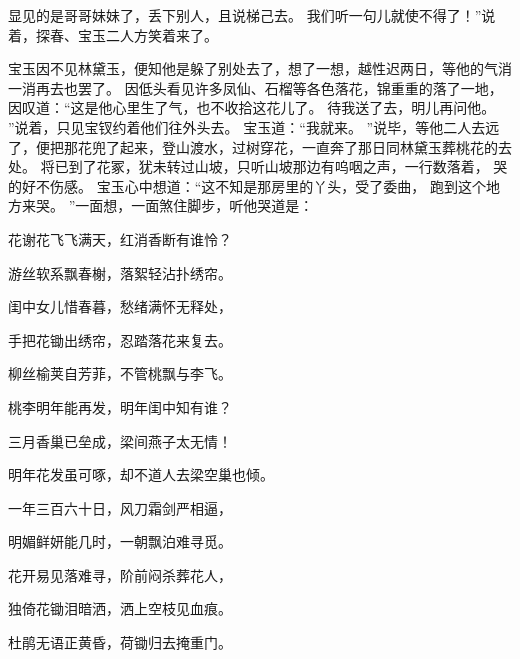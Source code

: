 显见的是哥哥妹妹了，丢下别人，且说梯己去。
我们听一句儿就使不得了！”说着，探春、宝玉二人方笑着来了。
\par
宝玉因不见林黛玉，便知他是躲了别处去了，想了一想，越性迟两日，等他的气消一消再去也罢了。
因低头看见许多凤仙、石榴等各色落花，锦重重的落了一地，因叹道：“这是他心里生了气，也不收拾这花儿了。
待我送了去，明儿再问他。
”说着，只见宝钗约着他们往外头去。
宝玉道：“我就来。
”说毕，等他二人去远了，便把那花兜了起来，登山渡水，过树穿花，一直奔了那日同林黛玉葬桃花的去处。
将已到了花冢，犹未转过山坡，只听山坡那边有呜咽之声，一行数落着，
哭的好不伤感。
宝玉心中想道：“这不知是那房里的丫头，受了委曲，
跑到这个地方来哭。
”一面想，一面煞住脚步，听他哭道是：
\par
{}\par
\hop
花谢花飞飞满天，红消香断有谁怜？\par
游丝软系飘春榭，落絮轻沾扑绣帘。
\par
闺中女儿惜春暮，愁绪满怀无释处，\par
手把花锄出绣帘，忍踏落花来复去。
\par
柳丝榆荚自芳菲，不管桃飘与李飞。
\par
桃李明年能再发，明年闺中知有谁？\par
三月香巢已垒成，梁间燕子太无情！\par
明年花发虽可啄，却不道人去梁空巢也倾。
\par
一年三百六十日，风刀霜剑严相逼，\par
明媚鲜妍能几时，一朝飘泊难寻觅。
\par
花开易见落难寻，阶前闷杀葬花人，\par
独倚花锄泪暗洒，洒上空枝见血痕。
\par
杜鹃无语正黄昏，荷锄归去掩重门。
